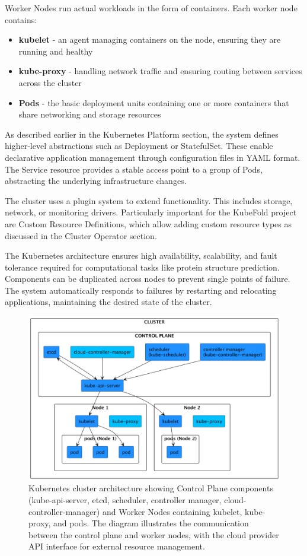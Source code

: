 Worker Nodes run actual workloads in the form of containers. Each worker node contains:
\begin{itemize}
    \item \textbf{kubelet} - an agent managing containers on the node, ensuring they are running and healthy
    \item \textbf{kube-proxy} - handling network traffic and ensuring routing between services across the cluster
    \item \textbf{Pods} - the basic deployment units containing one or more containers that share networking and storage resources
\end{itemize}

As described earlier in the Kubernetes Platform section, the system defines higher-level abstractions such as Deployment or StatefulSet. These enable declarative application management through configuration files in YAML format. The Service resource provides a stable access point to a group of Pods, abstracting the underlying infrastructure changes.

The cluster uses a plugin system to extend functionality. This includes storage, network, or monitoring drivers. Particularly important for the KubeFold project are Custom Resource Definitions, which allow adding custom resource types as discussed in the Cluster Operator section.

The Kubernetes architecture ensures high availability, scalability, and fault tolerance required for computational tasks like protein structure prediction. Components can be duplicated across nodes to prevent single points of failure. The system automatically responds to failures by restarting and relocating applications, maintaining the desired state of the cluster.

\begin{figure}[htbp]
    \centering
    \includegraphics[width=\textwidth]{images/kubernetes.png}
    \caption{Kubernetes cluster architecture showing Control Plane components (kube-api-server, etcd, scheduler, controller manager, cloud-controller-manager) and Worker Nodes containing kubelet, kube-proxy, and pods. The diagram illustrates the communication between the control plane and worker nodes, with the cloud provider API interface for external resource management.}
    \label{fig:kubernetes-architecture}
\end{figure}

